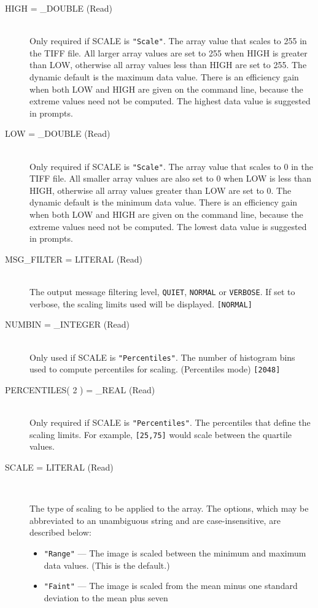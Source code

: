 \documentclass[twoside,11pt]{article}
\newcommand{\sstsubsection}[1]{ \item[{#1}] \mbox{} \\}
\newcommand{\ssthitemlist}[1]{
  \latexonly{
  \mbox{} \\
  \vspace{-3.5ex}
  }
  \begin{itemize}
     #1
  \end{itemize}
}
\newcommand{\sstitem}{\item}
\newcommand{\sstsubsection}[1]{\item[{#1}]}
\newcommand{\sstitem}{\item}
\begin{document}
{   \begin{description}
      \sstsubsection{
        HIGH = \_DOUBLE (Read)
      }{
        Only required if SCALE is {\texttt{"Scale"}}.
        The array value that scales to 255 in the TIFF file.
        All larger array values are set to 255 when HIGH is greater than
        LOW, otherwise all array values less than HIGH are set to 255.
        The dynamic default is the maximum data value.  There is an
        efficiency gain when both LOW and HIGH are given on the
        command line, because the extreme values need not be computed.
        The highest data value is suggested in prompts.
      }
      \sstsubsection{
        LOW = \_DOUBLE (Read)
      }{
        Only required if SCALE is {\texttt{"Scale"}}.
        The array value that scales to 0 in the TIFF file.
        All smaller array values are also set to 0 when LOW is less than
        HIGH, otherwise all array values greater than LOW are set to 0.
        The dynamic default is the minimum data value.  There is an
        efficiency gain when both LOW and HIGH are given on the
        command line, because the extreme values need not be computed.
        The lowest data value is suggested in prompts.
      }
      \sstsubsection{
        MSG\_FILTER = LITERAL (Read)
      }{
        The output message filtering level, \texttt{QUIET}, \texttt{NORMAL} or
        \texttt{VERBOSE}. If set to verbose, the scaling limits used will be
        displayed. \texttt{[NORMAL]}
      } 
      \sstsubsection{
        NUMBIN  =  \_INTEGER (Read)
      }{
        Only used if SCALE is {\texttt{"Percentiles"}}.
        The number of histogram bins used to compute percentiles for
        scaling. (Percentiles mode) \texttt{[2048]}
      }
      \sstsubsection{
        PERCENTILES( 2 ) = \_REAL (Read)
      }{
        Only required if SCALE is {\texttt{"Percentiles"}}.
        The percentiles that define the scaling limits. For example,
        {\texttt{[25,75]}} would scale between the quartile values.
      }
      \sstsubsection{
         SCALE = LITERAL (Read)
      }{
        The type of scaling to be applied to the array.  The options, which
        may be abbreviated to an unambiguous string and are case-insensitive,
        are described below:
        \ssthitemlist{
           \sstitem
           {\texttt{"Range"}} --- The image is scaled between the minimum and
                          maximum data values. (This is the default.)
           \sstitem
           {\texttt{"Faint"}} --- The image is scaled from the mean minus one
                          standard deviation to the mean plus seven
}}
\end{description}}
\end{document}
